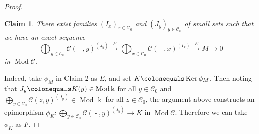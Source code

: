 \documentclass{surv-l}
\numberwithin{equation}{chapter}
\numberwithin{figure}{chapter}
\theoremstyle{plain}
\newtheorem{clm}{Claim}
\theoremstyle{definition}
\theoremstyle{remark}
\DeclareMathOperator{\Ker}{Ker}
\DeclareMathOperator{\Mod}{Mod}
\DeclareMathOperator{\blank}{-}
\begin{document}
\begin{proof}
\begin{clm}
There exist families $(I_x)_{x \in {\mathcal{C}}_0}$ and
$(J_y)_{y \in {\mathcal{C}}_0}$ of small sets such that
we have an exact sequence
\begin{equation}\label{eq:small-proj-pres}
\bigoplus_{y \in {\mathcal{C}}_0}{\mathcal{C}}(\blank, y)^{(J_y)} \xrightarrow{F} \bigoplus_{x \in {\mathcal{C}}_0}{\mathcal{C}}(\blank, x)^{(I_x)} \xrightarrow{E} M \to 0
\end{equation}
in $\Mod{\mathcal{C}}$.
\end{clm}

Indeed, take $\phi_M$ in Claim 2 as $E$,
and set $K\colonequals  \Ker \phi_M$.
Then noting that $J_y\colonequals  K(y) \in \Mod \Bbbk$ for all $y \in {\mathcal{C}}_0$ and
$\bigoplus_{y \in {\mathcal{C}}_0}{\mathcal{C}}(z, y)^{(J_y)} \in \Mod \Bbbk$ for all $z \in {\mathcal{C}}_0$,
the argument above constructs an epimorphism
$
\phi_K \colon \bigoplus_{y \in {\mathcal{C}}_0}{\mathcal{C}}(\blank, y)^{(J_y)} \to K
$
in $\Mod {\mathcal{C}}$.
Therefore we can take $\phi_K$ as $F$.


\end{proof}
\end{document}
